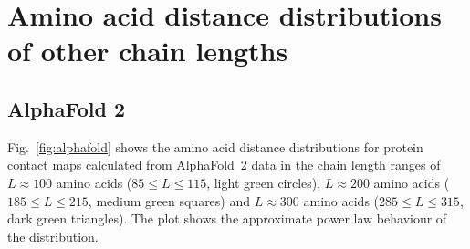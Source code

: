 \documentclass[notitlepage,
reprint,%
onecolumn,
amsmath,amssymb,superscriptaddress,aps,
pre,floatfix]{revtex4-1}
\begin{document}
\section*{Amino acid distance distributions of other chain lengths}
\subsection{AlphaFold 2}
Fig.~\ref{fig:alphafold} shows the amino acid distance distributions for protein contact maps calculated from AlphaFold~2 data in the chain length ranges of $L \approx 100$ amino acids ($85 \leq L \leq 115$, light green circles), $L \approx 200$ amino acids ($185 \leq L \leq 215$, medium green squares) and $L \approx 300$ amino acids ($285 \leq L \leq 315$, dark green triangles). The plot shows the approximate power law behaviour of the distribution. 

\begin{figure}[htb]
\end{figure}
\end{document}
